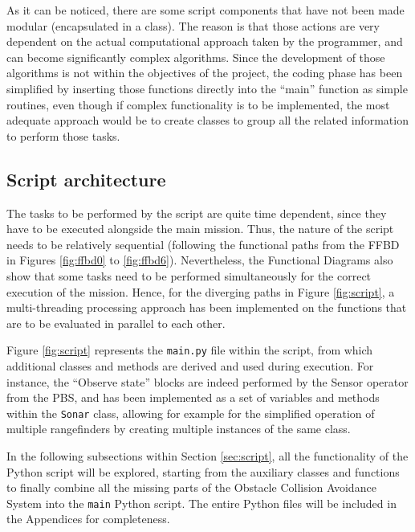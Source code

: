 

As it can be noticed, there are some script components that have not been made modular (encapsulated in a class).
The reason is that those actions are very dependent on the actual computational approach taken by the programmer, and can become significantly complex algorithms.
Since the development of those algorithms is not within the objectives of the project, the coding phase has been simplified by inserting those functions directly into the ``main'' function as simple routines, even though if complex functionality is to be implemented, the most adequate approach would be to create classes to group all the related information to perform those tasks.

\subsection{Script architecture}

The tasks to be performed by the script are quite time dependent, since they have to be executed alongside the main mission.
Thus, the nature of the script needs to be relatively sequential (following the functional paths from the FFBD in Figures \ref{fig:ffbd0} to \ref{fig:ffbd6}).
Nevertheless, the Functional Diagrams also show that some tasks need to be performed simultaneously for the correct execution of the mission.
Hence, for the diverging paths in Figure \ref{fig:script}, a multi-threading processing approach has been implemented on the functions that are to be evaluated in parallel to each other.



Figure \ref{fig:script} represents the \texttt{main.py} file within the script, from which additional classes and methods are derived and used during execution.
For instance, the ``Observe state'' blocks are indeed performed by the Sensor operator from the PBS, and has been implemented as a set of variables and methods within the \texttt{Sonar} class, allowing for example for the simplified operation of multiple rangefinders by creating multiple instances of the same class.

In the following subsections within Section \ref{sec:script}, all the functionality of the Python script will be explored, starting from the auxiliary classes and functions to finally combine all the missing parts of the Obstacle Collision Avoidance System into the \texttt{main} Python script.
The entire Python files will be included in the Appendices for completeness.


